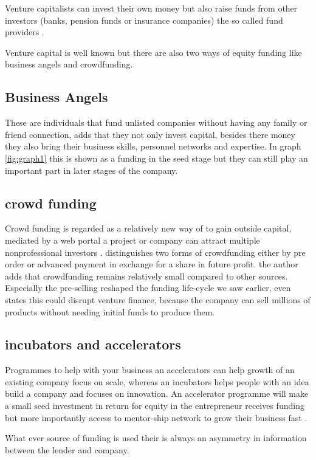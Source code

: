 \documentclass[a4paper, 11pt]{article}
\begin{document}
Venture capitalists can invest their own money but also raise funds from other investors (banks, pension funds or insurance companies) the so called fund providers \citep{casson2008oxford}.

Venture capital is well known but there are also two ways of equity funding like business angels and crowdfunding.

\subsection{Business Angels}
These are individuals that fund unlisted companies without having any family or friend connection, \citep{politis} adds that they not only invest capital, besides there money they also bring their business skills, personnel networks and expertise. In graph \ref{fig:graph1} this is shown as a funding in the seed stage but they can still play an important part in later stages of the company.


\subsection{crowd funding}
Crowd funding is regarded as a relatively new way of to gain outside capital, mediated by a web portal a project or company can attract multiple nonprofessional investors \cite{TiddBessant}. \citep{belleflamme} distinguishes two forms of crowdfunding either by pre order or advanced payment in exchange for a share in future profit. the author adds that crowdfunding  remains relatively small compared to other sources. Especially the pre-selling reshaped the funding life-cycle we saw earlier, \cite{bella} even states this could disrupt venture finance, because the company can sell millions of products without needing initial funds to produce them.

\subsection{incubators and accelerators}
Programmes to help with your business an accelerators can help growth of an existing company focus on scale, whereas an incubators helps people with an idea build a company and focuses on innovation. An accelerator programme will make a small seed investment in return for equity in the entrepreneur receives funding but more importantly access to mentor-ship network to grow their business fast \citep{forrest}.

What ever source of funding is used their is always an asymmetry in information between the lender and company.
\end{document}

